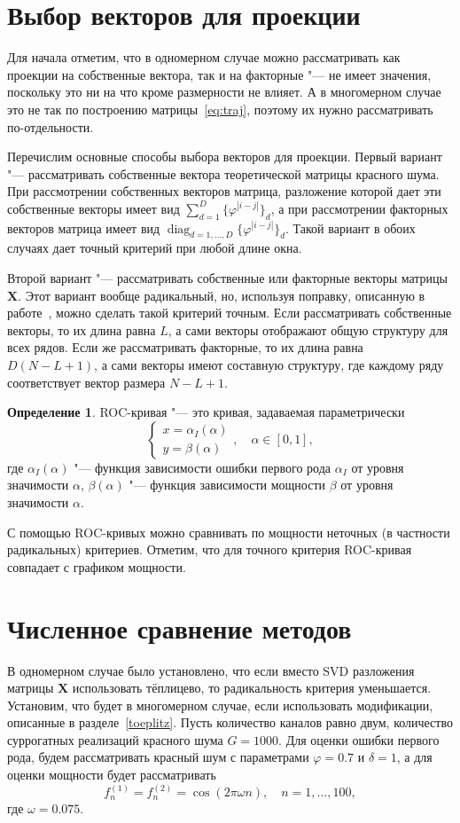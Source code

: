 \documentclass[specialist,
substylefile = spbu_report.rtx,
subf,href,colorlinks=true, 12pt]{disser}
\newcommand{\traj}{\mathbf{X}}
\theoremstyle{definition}
\newtheorem{definition}{Определение}
\begin{document}
	\section{Выбор векторов для проекции}
	Для начала отметим, что в одномерном случае можно рассматривать как проекции на собственные вектора, так и на факторные  "--- не имеет значения, поскольку это ни на что кроме размерности не влияет. А в многомерном случае это не так по построению матрицы~\eqref{eq:traj}, поэтому их нужно рассматривать по-отдельности.
	
	Перечислим основные способы выбора векторов для проекции. Первый вариант "--- рассматривать собственные вектора теоретической матрицы красного шума. При рассмотрении собственных векторов матрица, разложение которой дает эти собственные векторы имеет вид $\sum_{d=1}^D \{\varphi^{|i-j|}\}_d$, а при рассмотрении факторных векторов матрица имеет вид $\operatorname{diag}_{d=1,\ldots,D}\{\varphi^{|i-j|}\}_d$. Такой вариант в обоих случаях дает точный критерий при любой длине окна. 
	
	Второй вариант "--- рассматривать собственные или факторные векторы матрицы $\traj$. Этот вариант вообще радикальный, но, используя поправку, описанную в работе~\cite{master}, можно сделать такой критерий точным. Если рассматривать собственные векторы, то их длина равна $L$, а сами векторы отображают общую структуру для всех рядов. Если же рассматривать факторные, то их длина равна $D(N-L+1)$, а сами векторы имеют составную структуру, где каждому ряду соответствует вектор размера $N-L+1$.
	
	\begin{definition}
		ROC-кривая "--- это кривая, задаваемая параметрически
		\[
		\begin{cases}
		x=\alpha_I(\alpha)\\
		y=\beta(\alpha)
		\end{cases},\quad \alpha\in[0,1],
		\]
		где $\alpha_I(\alpha)$ "--- функция зависимости ошибки первого рода $\alpha_I$ от уровня значимости $\alpha$, $\beta(\alpha)$ "--- функция зависимости мощности $\beta$ от уровня значимости $\alpha$.
	\end{definition}
	С помощью ROC-кривых можно сравнивать по мощности неточных (в частности радикальных) критериев. Отметим, что для точного критерия ROC-кривая совпадает с графиком мощности.
	\section{Численное сравнение методов}
	В одномерном случае было установлено, что если вместо SVD разложения матрицы $\traj$ использовать тёплицево, то радикальность критерия уменьшается. Установим, что будет в многомерном случае, если использовать модификации, описанные в разделе~\ref{toeplitz}.
	Пусть количество каналов равно двум, количество суррогатных реализаций красного шума $G=1000$. Для оценки ошибки первого рода, будем рассматривать красный шум с параметрами $\varphi=0.7$ и $\delta=1$, а для оценки мощности будет рассматривать
	\[
	f_n^{(1)}=f_n^{(2)}=\cos(2\pi\omega n),\quad n=1,\ldots, 100,
	\]
	где $\omega=0.075$.
	
\end{document}
